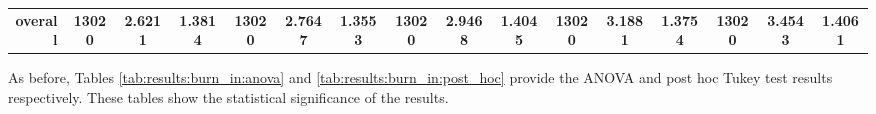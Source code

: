 \begin{table}[htbp]
{\begin{tabular}{rccccccccccccccc}
                  \midrule
                  \textbf{overall}                    & \textbf{13020}                        & \cellcolor[rgb]{ .776,  .937,  .808}\textcolor[rgb]{ 0,  .38,  0}{\textbf{2.6211}} & \textbf{1.3814} & \textbf{13020} & \textbf{2.7647}                                                           & \textbf{1.3553} & \textbf{13020} & \textbf{2.9468}                                                           & \textbf{1.4045} & \textbf{13020} & \textbf{3.1881}                                                           & \textbf{1.3754} & \textbf{13020} & \textbf{3.4543} & \textbf{1.4061} \\
            \end{tabular}%
      }
\end{table}%


As before, Tables \ref{tab:results:burn_in:anova} and \ref{tab:results:burn_in:post_hoc} provide the ANOVA and post hoc Tukey test results respectively. These tables show the statistical significance of the results.

\begin{table}[htbp]
      \centering
      \caption{ANOVA - Rank - BHH Variant: Burn In}
      \label{tab:results:burn_in:anova}%
      \par\bigskip
\end{table}



